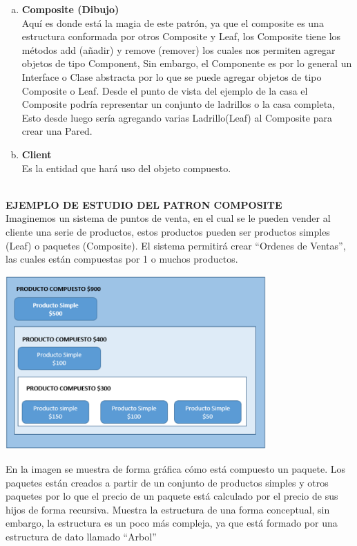 \begin{flushleft}
\begin{enumerate}[a)]
	\item \textbf{Composite (Dibujo)}\\ 
Aquí es donde está la magia de este patrón, ya que el composite es una estructura conformada por otros Composite y Leaf, los Composite tiene los métodos add  (añadir) y remove (remover) los cuales nos permiten agregar objetos de tipo Component, Sin embargo, el Componente es por lo general un Interface o Clase abstracta  por lo que se puede agregar objetos de tipo Composite o Leaf.   Desde el punto de vista del ejemplo de la casa el Composite podría representar un conjunto de ladrillos o la casa completa, Esto desde luego sería agregando varias Ladrillo(Leaf) al Composite para crear una Pared.

	\item \textbf{ Client}\\ 
Es la entidad que hará uso del objeto compuesto.
    \end{enumerate}

\textbf{}\\ 
\textbf{EJEMPLO DE ESTUDIO DEL PATRON COMPOSITE}\\ 
Imaginemos un sistema de puntos de venta, en el cual se le pueden vender al cliente una serie de productos, estos productos pueden ser productos simples (Leaf) o paquetes (Composite).  El sistema permitirá crear “Ordenes de Ventas”, las cuales están compuestas por 1 o muchos productos.

\begin{center}
	\includegraphics[width=10cm]{./Imagenes/composite3} 
	\end{center}

En la imagen se muestra de forma gráfica cómo está compuesto un paquete.  Los paquetes están creados a partir de un conjunto de productos simples y otros paquetes por lo que el precio de un paquete está calculado por el precio de sus hijos de forma recursiva.  Muestra la estructura de una forma conceptual, sin embargo, la estructura es un poco más compleja, ya que está formado por una estructura de dato llamado “Arbol”


\end{flushleft}
